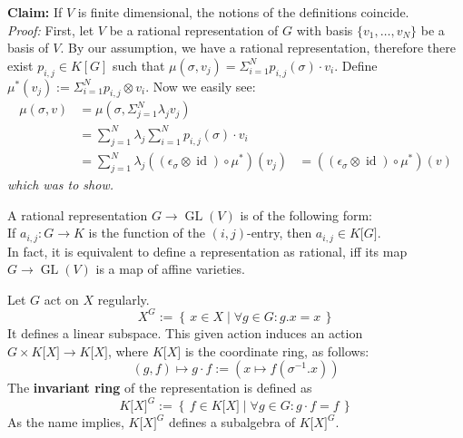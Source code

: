 \textbf{Claim:} If $V$ is finite dimensional, the notions of the definitions coincide.\\
\textit{Proof:} First, let $V$ be a rational representation of $G$ with basis $\{ v_1 , \ldots , v_N \}$ be a basis of $V$.
By our assumption, we have a rational representation, therefore there exist $p_{i,j} \in K \left\lbrack G \right\rbrack$ such that $\mu\left( \sigma, v_j \right) = \Sigma_{i=1}^{N} p_{i,j}\left(\sigma\right) \cdot v_i$.
Define $\mu^\ast \left( v_j \right) := \Sigma_{i=1}^{N} p_{i,j} \otimes v_i$.
Now we easily see:
\begin{equation}
  \begin{aligned}
    \mu\left(\sigma,v\right)
    &= \mu \left(\sigma, \Sigma_{j=1}^N \lambda_j v_j \right) \\
    &= \sum_{j=1}^N \lambda_j  \sum_{i=1}^N p_{i,j}\left(\sigma\right) \cdot v_i \\
    &= \sum_{j=1}^N \lambda_j \left(\left(\epsilon_\sigma \otimes \operatorname{id} \right) \circ \mu^\ast \right) \left(v_j \right)
    &= \left(\left(\epsilon_\sigma \otimes \operatorname{id} \right) \circ \mu^\ast \right) \left(v \right)
  \end{aligned}
\end{equation}
\textit{which was to show.}

\begin{remark}
  A rational representation $ G \longrightarrow \operatorname{GL}\left(V\right) $ is of the following form:\\
  If $ a_{i,j} : G \longrightarrow K $ is the function of the $\left( i,j \right) $-entry, then $ a_{i,j} \in K\lbrack G\rbrack $.\\
  In fact, it is equivalent to define a representation as rational, iff its map $ G \longrightarrow \operatorname{GL} \left( V \right) $ is a map of affine varieties.
\end{remark}

\begin{definition}[Invariants]
  Let $ G $ act on $ X $ regularly.
  \begin{equation}
    X^G := \left\{\, x \in X \mid \forall g \in G : g . x = x \,\right\}
  \end{equation}
  It defines a linear subspace.
  This given action induces an action $ G \times K\lbrack X\rbrack \longrightarrow K\lbrack X\rbrack $, where $K\lbrack X\rbrack$ is the coordinate ring, as follows:
  \begin{equation}
    \left( g , f \right) \longmapsto g \cdot f :=
    \left( x \mapsto f \left( \sigma^{-1} . x \right) \right)
  \end{equation}
  The \textbf{invariant ring} of the representation is defined as
  \begin{equation}
    K\lbrack X\rbrack^G := \left\{ \, f \in K\lbrack X \rbrack \mid \forall g \in G : g \cdot f = f \, \right\}
  \end{equation}
  As the name implies, $ K\lbrack X\rbrack^G $ defines a subalgebra of $ K\lbrack X\rbrack^G $.
\end{definition}

